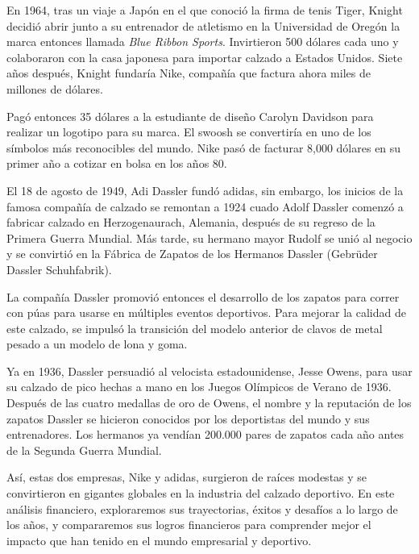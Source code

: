 \documentclass[a4paper,12pt]{article}
\begin{document}
En 1964, tras un viaje a Japón en el que conoció la firma de tenis Tiger, Knight decidió abrir junto a su entrenador de atletismo en la Universidad de Oregón la marca entonces llamada \emph{Blue Ribbon Sports}. Invirtieron 500 dólares cada uno y colaboraron con la casa japonesa para importar calzado a Estados Unidos. Siete años después, Knight fundaría Nike, compañía que factura ahora miles de millones de dólares.\par

Pagó entonces 35 dólares a la estudiante de diseño Carolyn Davidson para realizar un logotipo para su marca. El swoosh se convertiría en uno de los símbolos más reconocibles del mundo. Nike pasó de facturar 8,000 dólares en su primer año a cotizar en bolsa en los años 80. \par

El 18 de agosto de 1949, Adi Dassler fundó adidas, sin embargo, los inicios de la famosa compañía de calzado se remontan a 1924 cuado Adolf Dassler comenzó a fabricar calzado en Herzogenaurach, Alemania, después de su regreso de la Primera Guerra Mundial. Más tarde, su hermano mayor Rudolf se unió al negocio y se convirtió en la Fábrica de Zapatos de los Hermanos Dassler (Gebrüder Dassler Schuhfabrik). \par

La compañía Dassler promovió entonces el desarrollo de los zapatos para correr con púas para usarse en múltiples eventos deportivos. Para mejorar la calidad de este calzado, se impulsó la transición del modelo anterior de clavos de metal pesado a un modelo de lona y goma.\par

Ya en 1936, Dassler persuadió al velocista estadounidense, Jesse Owens, para usar su calzado de pico hechas a mano en los Juegos Olímpicos de Verano de 1936. Después de las cuatro medallas de oro de Owens, el nombre y la reputación de los zapatos Dassler se hicieron conocidos por los deportistas del mundo y sus entrenadores. Los hermanos ya vendían 200.000 pares de zapatos cada año antes de la Segunda Guerra Mundial.\par

Así, estas dos empresas, Nike y adidas, surgieron de raíces modestas y se convirtieron en gigantes globales en la industria del calzado deportivo. En este análisis financiero, exploraremos sus trayectorias, éxitos y desafíos a lo largo de los años, y compararemos sus logros financieros para comprender mejor el impacto que han tenido en el mundo empresarial y deportivo.\par
\end{document}
